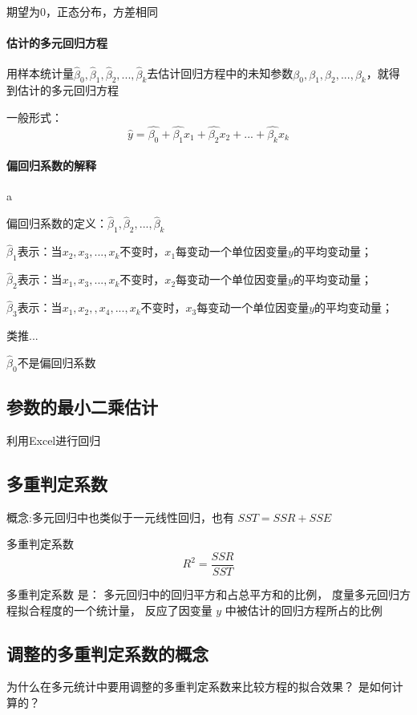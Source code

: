 \documentclass[UTF8,10pt]{book}
\begin{document}
期望为0，正态分布，方差相同

\paragraph{估计的多元回归方程}	用样本统计量$ \hat{\beta}_0,\hat{\beta}_1,\hat{\beta}_2,...,\hat{\beta}_k $去估计回归方程中的未知参数$\beta_0,\beta_1,\beta_2,...,\beta_k$，就得到估计的多元回归方程 

一般形式：
$$\hat{y} = \hat{\beta_0} + \hat{\beta_1} x_1 + \hat{\beta_2} x_2 + ... + \hat{\beta_k} x_k$$

\paragraph{偏回归系数的解释}	a

偏回归系数的定义：$ \hat{\beta}_1,\hat{\beta}_2,...,\hat{\beta}_k $ 

$\hat{\beta}_1$表示：当$ x_2,x_3,...,x_k$不变时，$x_1$每变动一个单位因变量$y$的平均变动量； 

$\hat{\beta}_2$表示：当$ x_1,x_3,...,x_k$不变时，$x_2$每变动一个单位因变量$y$的平均变动量；

$\hat{\beta}_3$表示：当$ x_1,x_2,,x_4,...,x_k$不变时，$x_3$每变动一个单位因变量$y$的平均变动量； 

类推... 

$\hat{\beta}_0 $不是偏回归系数


\subsection{参数的最小二乘估计}
	
利用Excel进行回归	

\subsection{多重判定系数}
概念:多元回归中也类似于一元线性回归，也有 $ SST = SSR + SSE $ 

多重判定系数 
$$ R^2 = \frac{SSR}{SST} $$ 

多重判定系数 是： 多元回归中的回归平方和占总平方和的比例，
度量多元回归方程拟合程度的一个统计量，
反应了因变量 $y$ 中被估计的回归方程所占的比例

\subsection{调整的多重判定系数的概念}

为什么在多元统计中要用调整的多重判定系数来比较方程的拟合效果？ 是如何计算的？ 
\end{document}
